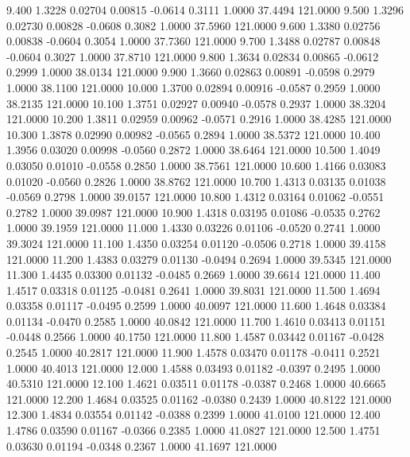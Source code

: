    9.400   1.3228   0.02704   0.00815  -0.0614   0.3111   1.0000  37.4494 121.0000
   9.500   1.3296   0.02730   0.00828  -0.0608   0.3082   1.0000  37.5960 121.0000
   9.600   1.3380   0.02756   0.00838  -0.0604   0.3054   1.0000  37.7360 121.0000
   9.700   1.3488   0.02787   0.00848  -0.0604   0.3027   1.0000  37.8710 121.0000
   9.800   1.3634   0.02834   0.00865  -0.0612   0.2999   1.0000  38.0134 121.0000
   9.900   1.3660   0.02863   0.00891  -0.0598   0.2979   1.0000  38.1100 121.0000
  10.000   1.3700   0.02894   0.00916  -0.0587   0.2959   1.0000  38.2135 121.0000
  10.100   1.3751   0.02927   0.00940  -0.0578   0.2937   1.0000  38.3204 121.0000
  10.200   1.3811   0.02959   0.00962  -0.0571   0.2916   1.0000  38.4285 121.0000
  10.300   1.3878   0.02990   0.00982  -0.0565   0.2894   1.0000  38.5372 121.0000
  10.400   1.3956   0.03020   0.00998  -0.0560   0.2872   1.0000  38.6464 121.0000
  10.500   1.4049   0.03050   0.01010  -0.0558   0.2850   1.0000  38.7561 121.0000
  10.600   1.4166   0.03083   0.01020  -0.0560   0.2826   1.0000  38.8762 121.0000
  10.700   1.4313   0.03135   0.01038  -0.0569   0.2798   1.0000  39.0157 121.0000
  10.800   1.4312   0.03164   0.01062  -0.0551   0.2782   1.0000  39.0987 121.0000
  10.900   1.4318   0.03195   0.01086  -0.0535   0.2762   1.0000  39.1959 121.0000
  11.000   1.4330   0.03226   0.01106  -0.0520   0.2741   1.0000  39.3024 121.0000
  11.100   1.4350   0.03254   0.01120  -0.0506   0.2718   1.0000  39.4158 121.0000
  11.200   1.4383   0.03279   0.01130  -0.0494   0.2694   1.0000  39.5345 121.0000
  11.300   1.4435   0.03300   0.01132  -0.0485   0.2669   1.0000  39.6614 121.0000
  11.400   1.4517   0.03318   0.01125  -0.0481   0.2641   1.0000  39.8031 121.0000
  11.500   1.4694   0.03358   0.01117  -0.0495   0.2599   1.0000  40.0097 121.0000
  11.600   1.4648   0.03384   0.01134  -0.0470   0.2585   1.0000  40.0842 121.0000
  11.700   1.4610   0.03413   0.01151  -0.0448   0.2566   1.0000  40.1750 121.0000
  11.800   1.4587   0.03442   0.01167  -0.0428   0.2545   1.0000  40.2817 121.0000
  11.900   1.4578   0.03470   0.01178  -0.0411   0.2521   1.0000  40.4013 121.0000
  12.000   1.4588   0.03493   0.01182  -0.0397   0.2495   1.0000  40.5310 121.0000
  12.100   1.4621   0.03511   0.01178  -0.0387   0.2468   1.0000  40.6665 121.0000
  12.200   1.4684   0.03525   0.01162  -0.0380   0.2439   1.0000  40.8122 121.0000
  12.300   1.4834   0.03554   0.01142  -0.0388   0.2399   1.0000  41.0100 121.0000
  12.400   1.4786   0.03590   0.01167  -0.0366   0.2385   1.0000  41.0827 121.0000
  12.500   1.4751   0.03630   0.01194  -0.0348   0.2367   1.0000  41.1697 121.0000
